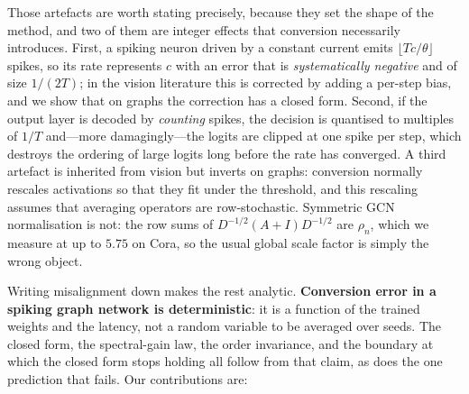 \documentclass[10pt,twocolumn]{article}
\newcommand{\rhon}{\rho_{n}}
\begin{document}
Those artefacts are worth stating precisely, because they set the shape of the method, and two of
them are integer effects that conversion necessarily introduces. First, a spiking neuron driven by a
constant current emits $\lfloor Tc/\theta \rfloor$ spikes, so its rate represents $c$ with an error
that is \emph{systematically negative} and of size $1/(2T)$; in the vision literature this is
corrected by adding a per-step bias, and we show that on graphs the correction has a closed form.
Second, if the output layer is decoded by \emph{counting} spikes, the decision is quantised to
multiples of $1/T$ and---more damagingly---the logits are clipped at one spike per step, which
destroys the ordering of large logits long before the rate has converged. A third artefact is
inherited from vision but inverts on graphs: conversion normally rescales activations so that they
fit under the threshold, and this rescaling assumes that averaging operators are row-stochastic.
Symmetric GCN normalisation is not: the row sums of $D^{-1/2}(A+I)D^{-1/2}$ are $\rhon$, which we
measure at up to $5.75$ on Cora, so the usual global scale factor is simply the wrong object.

Writing misalignment down makes the rest analytic. \textbf{Conversion error in a spiking graph
network is deterministic}: it is a function of the trained weights and the latency, not a random
variable to be averaged over seeds. The closed form, the spectral-gain law, the order invariance, and
the boundary at which the closed form stops holding all follow from that claim, as does the one
prediction that fails. Our contributions are:
\end{document}
